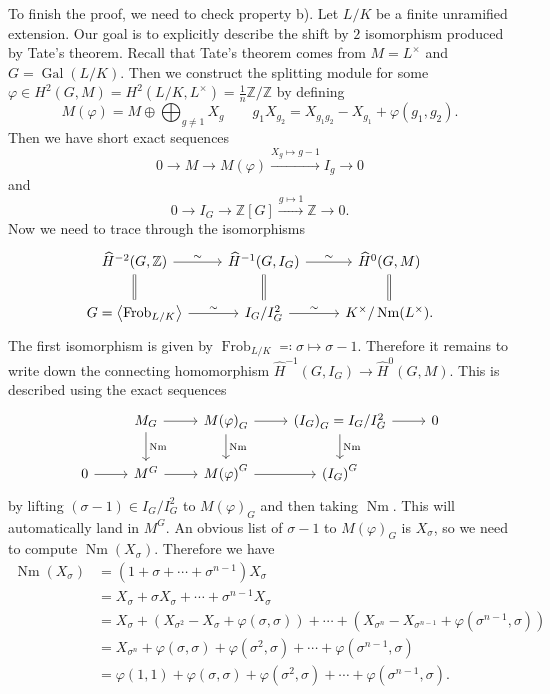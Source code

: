 \documentclass[leqno, openany]{memoir}
\theoremstyle{definition}
\theoremstyle{remark}
\theoremstyle{plain}
\theoremstyle{definition}
\theoremstyle{remark}
\newcommand{\Z}{\mathbb{Z}}
\newcommand{\wh}[1]{\widehat{#1}}
\DeclareMathOperator{\Gal}{Gal}
\DeclareMathOperator{\Nm}{Nm}
\DeclareMathOperator{\Frob}{Frob}
\begin{document}
To finish the proof, we need to check property b). Let $L/K$ be a finite unramified extension. Our goal is to explicitly describe the shift by $2$ isomorphism produced by Tate's theorem. Recall that Tate's theorem comes from $M = L^{\times}$ and $G = \Gal(L/K)$. Then we construct the splitting module for some $\varphi \in H^2(G, M) = H^2(L/K, L^{\times}) = \frac{1}{n} \Z/\Z$ by defining
\[ M(\varphi) = M \oplus \bigoplus_{g \neq 1} X_g \qquad g_1 X_{g_2} = X_{g_1g_2} - X_{g_1} + \varphi(g_1, g_2). \]
Then we have short exact sequences 
\[ 0 \to M \to M(\varphi)  \xrightarrow{X_g \mapsto g-1} I_g \to  0 \]
and
\[ 0 \to I_G \to \Z[G] \xrightarrow{g \mapsto 1} \Z \to 0. \]
Now we need to trace through the isomorphisms
\begin{equation*}
\begin{tikzcd}
    \wh{H}^{-2}(G, \Z) \ar{r}{\sim} \ar[equal]{d} & \wh{H}^{-1}(G, I_G) \ar{r}{\sim} \ar[equal]{d} & \wh{H}^0(G, M) \ar[equal]{d} \\
    G = \ev{\Frob_{L/K}} \ar{r}{\sim} & I_G/I_G^2 \ar{r}{\sim} & K^{\times}/\Nm(L^{\times}).
\end{tikzcd}
\end{equation*}
The first isomorphism is given by $\Frob_{L/K} \eqqcolon \sigma \mapsto \sigma - 1$. Therefore it remains to write down the connecting homomorphism $\wh{H}^{-1}(G, I_G) \to \wh{H}^0(G, M)$. This is described using the exact sequences
\begin{equation*}
\begin{tikzcd}
    & M_G \ar{r} \ar{d}{\Nm} & {M(\varphi)}_G \ar{r} \ar{d}{\Nm} & {(I_G)}_G = I_G/I_G^2 \ar{r} \ar{d}{\Nm} & 0 \\
    0 \ar{r} & M^G \ar{r} & {M(\varphi)}^G \ar{r} & {(I_G)}^G
\end{tikzcd}
\end{equation*}
by lifting $(\sigma - 1) \in I_G/I_G^2$ to ${M(\varphi)}_G$ and then taking $\Nm$. This will automatically land in $M^G$. An obvious list of $\sigma - 1$ to ${M(\varphi)}_G$ is $X_{\sigma}$, so we need to compute $\Nm(X_{\sigma})$. Therefore we have
\begin{align*}
    \Nm(X_{\sigma}) &= (1+ \sigma + \cdots + \sigma^{n-1}) X_{\sigma} \\
                    &= X_{\sigma} + \sigma X_{\sigma} + \cdots + \sigma^{n-1} X_{\sigma} \\
                    &= X_{\sigma} + (X_{\sigma^2}-X_{\sigma}+\varphi(\sigma, \sigma)) + \cdots + (X_{\sigma^n}-X_{\sigma^{n-1}}+\varphi(\sigma^{n-1}, \sigma)) \\
                    &= X_{\sigma^n} + \varphi(\sigma, \sigma) + \varphi(\sigma^2, \sigma) + \cdots + \varphi(\sigma^{n-1}, \sigma) \\
                    &= \varphi(1,1) + \varphi(\sigma, \sigma) + \varphi(\sigma^2, \sigma) + \cdots + \varphi(\sigma^{n-1}, \sigma).
\end{align*}
\end{document}

